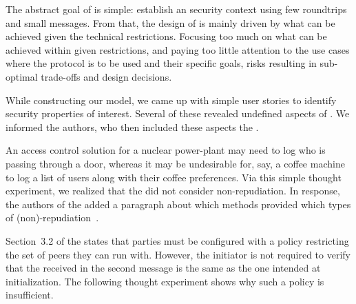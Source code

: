 \documentclass[runningheads, envcountsame, hidelinks, a4paper, draft, x11names]{llncs}
\begin{document}
The abstract goal of \mEdhoc{} is simple: establish an \mOscore{} security
context using few roundtrips and small messages.
%
From that, the design of \mEdhoc{} is mainly driven by what
can be achieved given the technical restrictions.
%
Focusing too much on what can be achieved within given restrictions, and paying
too little attention to the use cases where the
protocol is to be used and their specific goals, risks resulting in
sub-optimal trade-offs and design decisions.
%

%

While constructing our model, we came up with simple user stories to identify
security properties of interest.
%
Several of these revealed undefined aspects of \mEdhoc{}.
%
We informed the \mEdhoc{} authors, who then included these aspects the \mSpec{}.
%
%

An access control solution for a nuclear power-plant may need to log who is
passing through a door, whereas it may be undesirable for, say, a coffee
machine to log a list of users along with their coffee preferences.
%
Via this simple thought experiment, we realized that the \mSpec{} did not
consider non-repudiation.
%
In response, the authors of the \mSpec{} added a paragraph about which methods
provided which types of (non)-repudiation~\cite{selander-lake-edhoc-01}.

Section~3.2 of the \mSpec{} states that parties must be configured
with a policy restricting the set of peers they can run \mEdhoc{} with.
%
However, the initiator is not required to verify that the \mIdcredr{} received
in the second message is the same as the one intended at initialization.
%
The following thought experiment shows why such a policy is insufficient.
%
\end{document}
